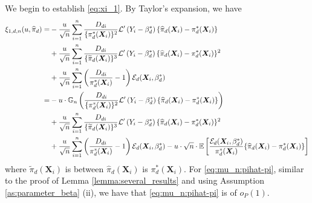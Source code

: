 \documentclass[11pt]{article}
\numberwithin{equation}{section}
\begin{document}
We begin to establish \eqref{eq:xi_1}. By Taylor's expansion, we have
\begin{align}
	\xi_{1,d,n}(u,\widehat{\pi}_d)
	=&-\frac{u}{\sqrt{n}}\sum_{i=1}^n\frac{D_{di}}{\{{\pi}^*_d(\boldsymbol{X}_{i})\}^2}\mathcal{L}'\left(Y_i-{\beta}_d^*\right)\{\widehat{\pi}_d(\boldsymbol{X}_{i})-\pi_d^*(\boldsymbol{X}_{i}) \} \notag\\
	&+\frac{u}{\sqrt{n}}\sum_{i=1}^n\frac{D_{di}}{\{\widetilde{\pi}_d(\boldsymbol{X}_{i})\}^3}\mathcal{L}'\left(Y_i-{\beta}_d^*\right)\{\widehat{\pi}_d(\boldsymbol{X}_{i})-\pi_d^*(\boldsymbol{X}_{i}) \}^2 \notag\\
	&+\frac{u}{\sqrt{n}}\sum_{i=1}^n\left(\frac{D_{di}}{\pi_d^*(\boldsymbol{X}_{i})}-1\right)\mathcal{E}_{d}(\boldsymbol{X}_{i},\beta_d^*)\notag\\
	=&-u\cdot \mathbb{G}_n\left(\frac{D_{di}}{\{{\pi}^*_d(\boldsymbol{X}_{i})\}^2}\mathcal{L}'\left(Y_i-{\beta}_d^*\right)\{\widehat{\pi}_d(\boldsymbol{X}_{i})-\pi_d^*(\boldsymbol{X}_{i}) \}\right)\label{eq:mu_n:pihat-pi}\\
	&+\frac{u}{\sqrt{n}}\sum_{i=1}^n\frac{D_{di}}{\{\widetilde{\pi}_d(\boldsymbol{X}_{i})\}^3}\mathcal{L}'\left(Y_i-{\beta}_d^*\right)\{\widehat{\pi}_d(\boldsymbol{X}_{i})-\pi_d^*(\boldsymbol{X}_{i}) \}^2 \label{eq:pihat-pi^2}\\
	&+\frac{u}{\sqrt{n}}\sum_{i=1}^n\left(\frac{D_{di}}{\pi_d^*(\boldsymbol{X}_{i})}-1\right)\mathcal{E}_{d}(\boldsymbol{X}_{i},\beta_d^*)-u\cdot\sqrt{n}\cdot\mathbb{E}\left[\frac{\mathcal{E}_{d}(\boldsymbol{X}_{i},\beta_d^*)}{{\pi}^*_d(\boldsymbol{X}_{i})}\{\widehat{\pi}_d(\boldsymbol{X}_{i})-\pi_d^*(\boldsymbol{X}_{i}) \}\right] \label{eq:Epihat-pi}
\end{align}	
where $\widetilde{\pi}_d(\boldsymbol{X}_{i})$ is between $\widehat{\pi}_d(\boldsymbol{X}_{i})$ is ${\pi}^*_d(\boldsymbol{X}_{i})$. For \eqref{eq:mu_n:pihat-pi}, similar to the proof of Lemma \ref{lemma:several_results} and using Assumption \ref{as:parameter_beta} (ii), we have that \eqref{eq:mu_n:pihat-pi} is of $o_P(1)$.
\end{document}
